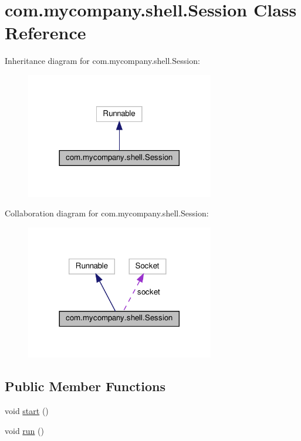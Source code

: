 \hypertarget{classcom_1_1mycompany_1_1shell_1_1Session}{}\section{com.\+mycompany.\+shell.\+Session Class Reference}
\label{classcom_1_1mycompany_1_1shell_1_1Session}


Inheritance diagram for com.\+mycompany.\+shell.\+Session\+:\nopagebreak
\begin{figure}[H]
\begin{center}
\leavevmode
\includegraphics[width=233pt]{classcom_1_1mycompany_1_1shell_1_1Session__inherit__graph}
\end{center}
\end{figure}


Collaboration diagram for com.\+mycompany.\+shell.\+Session\+:\nopagebreak
\begin{figure}[H]
\begin{center}
\leavevmode
\includegraphics[width=233pt]{classcom_1_1mycompany_1_1shell_1_1Session__coll__graph}
\end{center}
\end{figure}
\subsection*{Public Member Functions}
\begin{DoxyCompactItemize}
\item 
void \hyperlink{classcom_1_1mycompany_1_1shell_1_1Session_a5947495d51dd40ded3d116a9bf379bad}{start} ()
\item 
void \hyperlink{classcom_1_1mycompany_1_1shell_1_1Session_a7709b9accbec70e0beb28721eaea3994}{run} ()
\end{DoxyCompactItemize}


